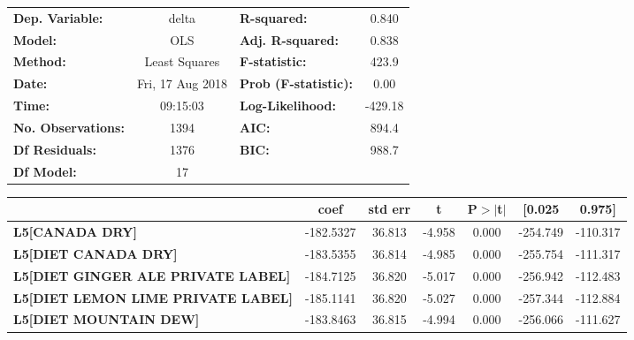 \begin{center}
\begin{tabular}{lclc}
\toprule
\textbf{Dep. Variable:}                    &      delta       & \textbf{  R-squared:         } &     0.840   \\
\textbf{Model:}                            &       OLS        & \textbf{  Adj. R-squared:    } &     0.838   \\
\textbf{Method:}                           &  Least Squares   & \textbf{  F-statistic:       } &     423.9   \\
\textbf{Date:}                             & Fri, 17 Aug 2018 & \textbf{  Prob (F-statistic):} &     0.00    \\
\textbf{Time:}                             &     09:15:03     & \textbf{  Log-Likelihood:    } &   -429.18   \\
\textbf{No. Observations:}                 &        1394      & \textbf{  AIC:               } &     894.4   \\
\textbf{Df Residuals:}                     &        1376      & \textbf{  BIC:               } &     988.7   \\
\textbf{Df Model:}                         &          17      & \textbf{                     } &             \\
\bottomrule
\end{tabular}
\begin{tabular}{lcccccc}
                                           & \textbf{coef} & \textbf{std err} & \textbf{t} & \textbf{P$>$$|$t$|$} & \textbf{[0.025} & \textbf{0.975]}  \\
\midrule
\textbf{L5[CANADA DRY]}                    &    -182.5327  &       36.813     &    -4.958  &         0.000        &     -254.749    &     -110.317     \\
\textbf{L5[DIET CANADA DRY]}               &    -183.5355  &       36.814     &    -4.985  &         0.000        &     -255.754    &     -111.317     \\
\textbf{L5[DIET GINGER ALE PRIVATE LABEL]} &    -184.7125  &       36.820     &    -5.017  &         0.000        &     -256.942    &     -112.483     \\
\textbf{L5[DIET LEMON LIME PRIVATE LABEL]} &    -185.1141  &       36.820     &    -5.027  &         0.000        &     -257.344    &     -112.884     \\
\textbf{L5[DIET MOUNTAIN DEW]}             &    -183.8463  &       36.815     &    -4.994  &         0.000        &     -256.066    &     -111.627     \\

\end{tabular}
\end{center}
